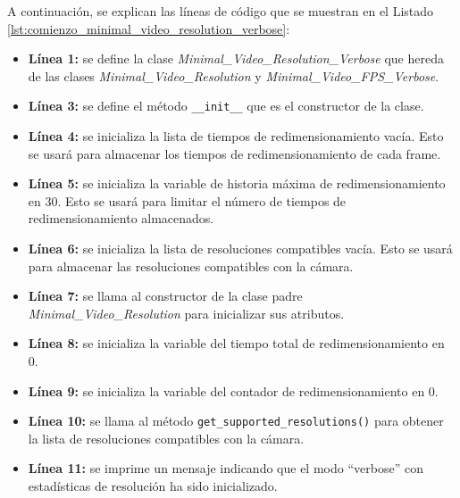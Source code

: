 A continuación, se explican las líneas de código que se muestran en el Listado \ref{lst:comienzo_minimal_video_resolution_verbose}:
\begin{itemize}
    \item \textbf{Línea 1:} se define la clase \textit{Minimal\_Video\_Resolution\_Verbose} que hereda de las clases \textit{Minimal\_Video\_Resolution} y \textit{Minimal\_Video\_FPS\_Verbose}.
    \item \textbf{Línea 3:} se define el método \texttt{\_\_init\_\_} que es el constructor de la clase.
    \item \textbf{Línea 4:} se inicializa la lista de tiempos de redimensionamiento vacía. Esto se usará para almacenar los tiempos de redimensionamiento de cada frame.
    \item \textbf{Línea 5:} se inicializa la variable de historia máxima de redimensionamiento en 30. Esto se usará para limitar el número de tiempos de redimensionamiento almacenados.
    \item \textbf{Línea 6:} se inicializa la lista de resoluciones compatibles vacía. Esto se usará para almacenar las resoluciones compatibles con la cámara.
    \item \textbf{Línea 7:} se llama al constructor de la clase padre \textit{Minimal\_Video\_Resolution} para inicializar sus atributos.
    \item \textbf{Línea 8:} se inicializa la variable del tiempo total de redimensionamiento en 0.
    \item \textbf{Línea 9:} se inicializa la variable del contador de redimensionamiento en 0.
    \item \textbf{Línea 10:} se llama al método \texttt{get\_supported\_resolutions()} para obtener la lista de resoluciones compatibles con la cámara.
    \item \textbf{Línea 11:} se imprime un mensaje indicando que el modo ``verbose'' con estadísticas de resolución ha sido inicializado.
\end{itemize}
\vspace{\baselineskip}


